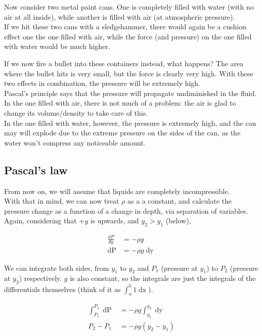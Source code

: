 Now consider two metal paint cans. One is completely filled with water (with no air at all inside), while another is filled with air (at atmospheric pressure).\\
If we hit these two cans with a sledgehammer, there would again be a cushion effect one the one filled with air, while the force (and pressure) on the one filled with water would be much higher.

If we now fire a bullet into these containers instead, what happens? The area where the bullet hits is very small, but the force is clearly very high. With these two effects in combination, the pressure will be extremely high.\\
Pascal's principle says that the pressure will propagate undiminished in the fluid.\\
In the one filled with air, there is not much of a problem: the air is glad to change its volume/density to take care of this.\\
In the one filled with water, however, the pressure is extremely high, and the can may will explode due to the extreme pressure on the sides of the can, as the water won't compress any noticeable amount.

\subsection{Pascal's law}

From now on, we will assume that liquids are completely incompressible.\\
With that in mind, we can now treat $\rho$ as a a constant, and calculate the pressure change as a function of a change in depth, via separation of variables. Again, considering that $+y$ is upwards, and $y_2 > y_1$ (below),

\begin{align}
\frac{dP}{dy} &= - \rho g\\
\mathop{dP} &= - \rho g \mathop{dy}
\end{align}

We can integrate both sides, from $y_1$ to $y_2$ and $P_1$ (pressure at $y_1$) to $P_2$ (pressure at $y_2$) respectively. $g$ is also constant, so the integrals are just the integrals of the differentials themselves (think of it as $\int_a^b 1 \mathop{dx}$).

\begin{align}
\int_{P_1}^{P_2} \mathop{dP} &= - \rho g \int_{y_1}^{y_2}\mathop{dy}\\
P_2 - P_1 &= -\rho g(y_2 - y_1)
\end{align}

